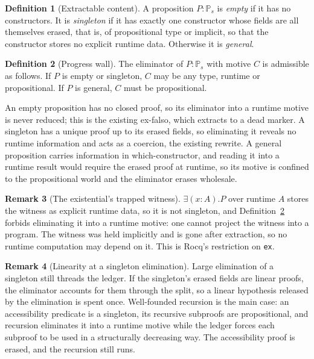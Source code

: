 \documentclass[11pt]{article}
\newcommand{\Prop}[1]{\mathbb{P}_{#1}}            %
\theoremstyle{definition}
\newtheorem{definition}{Definition}[section]
\newtheorem{remark}[definition]{Remark}
\theoremstyle{plain}
\begin{document}
\begin{definition}[Extractable content]
A proposition $P:\Prop{s}$ is \emph{empty} if it has no constructors. It is
\emph{singleton} if it has exactly one constructor whose fields are all themselves
erased, that is, of propositional type or implicit, so that the constructor stores
no explicit runtime data. Otherwise it is \emph{general}.
\end{definition}

\begin{definition}[Progress wall]\label{def:elim}
The eliminator of $P:\Prop{s}$ with motive $C$ is admissible as follows. If $P$
is empty or singleton, $C$ may be any type, runtime or propositional. If $P$ is
general, $C$ must be propositional.
\end{definition}

An empty proposition has no closed proof, so its eliminator into a runtime motive
is never reduced; this is the existing ex-falso, which extracts to a dead marker.
A singleton has a unique proof up to its erased fields, so eliminating it reveals
no runtime information and acts as a coercion, the existing rewrite. A general
proposition carries information in which-constructor, and reading it into a runtime
result would require the erased proof at runtime, so its motive is confined to the
propositional world and the eliminator erases wholesale.

\begin{remark}[The existential's trapped witness]
$\exists(x{:}A).P$ over runtime $A$ stores the witness as explicit runtime data,
so it is not singleton, and Definition~\ref{def:elim} forbids eliminating it into
a runtime motive: one cannot project the witness into a program. The witness was
held implicitly and is gone after extraction, so no runtime computation may
depend on it. This is Rocq's restriction on \texttt{ex}.
\end{remark}

\begin{remark}[Linearity at a singleton elimination]
Large elimination of a singleton still threads the ledger. If the singleton's
erased fields are linear proofs, the eliminator accounts for them through the
split, so a linear hypothesis released by the elimination is spent once.
Well-founded recursion is the main case: an accessibility predicate is a
singleton, its recursive subproofs are propositional, and recursion eliminates it
into a runtime motive while the ledger forces each subproof to be used in a
structurally decreasing way. The accessibility proof is erased, and the recursion
still runs.
\end{remark}
\end{document}
